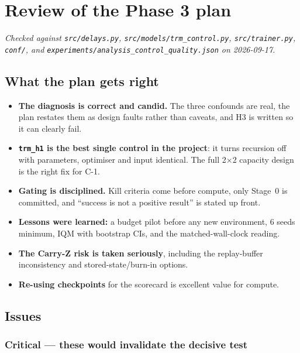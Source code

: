 \documentclass[11pt]{article}
\begin{document}
\section{Review of the Phase 3 plan}
\label{sec:review}
\noindent\emph{Checked against \texttt{src/delays.py}, \texttt{src/models/trm\_control.py}, \texttt{src/trainer.py}, \texttt{conf/}, and \texttt{experiments/analysis\_control\_quality.json} on 2026-09-17.}

\subsection{What the plan gets right}
\begin{itemize}
  \item \textbf{The diagnosis is correct and candid.} The three confounds are real, the plan restates them as design faults rather than caveats, and H3 is written so it can clearly fail.
  \item \textbf{\texttt{trm\_h1} is the best single control in the project}: it turns recursion off with parameters, optimiser and input identical. The full 2$\times$2 capacity design is the right fix for C-1.
  \item \textbf{Gating is disciplined.} Kill criteria come before compute, only Stage~0 is committed, and ``success is not a positive result'' is stated up front.
  \item \textbf{Lessons were learned:} a budget pilot before any new environment, 6 seeds minimum, IQM with bootstrap CIs, and the matched-wall-clock reading.
  \item \textbf{The Carry-Z risk is taken seriously}, including the replay-buffer inconsistency and stored-state/burn-in options.
  \item \textbf{Re-using checkpoints} for the scorecard is excellent value for compute.
\end{itemize}

\subsection{Issues}

\subsubsection*{Critical --- these would invalidate the decisive test}
\end{document}
